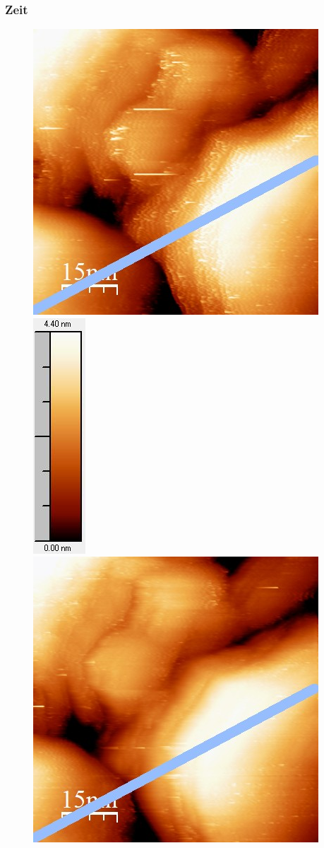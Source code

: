 \documentclass[12pt,a4paper]{article}
\begin{document}
\subsubsection{Zeit}
\begin{figure}[H]
\centering
\includegraphics[scale=0.6]{Bilder/Anhang/Zeit/0_052_Zeit_vor.jpg}
\includegraphics[scale=0.6]{Bilder/Anhang/Zeit/0_052_Zeit_vor_Skala.jpg}
\includegraphics[scale=0.6]{Bilder/Anhang/Zeit/0_052_Zeit_nach.jpg}

\end{figure}
\end{document}
